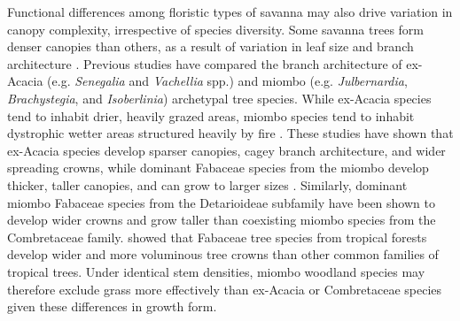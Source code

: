 \begin{refsection}
Functional differences among floristic types of savanna may also drive variation in canopy complexity, irrespective of species diversity. Some savanna trees form denser canopies than others, as a result of variation in leaf size and branch architecture \citep{CharlesDominique2018}. Previous studies have compared the branch architecture of ex-Acacia (e.g. \textit{Senegalia} and \textit{Vachellia} spp.) and miombo (e.g. \textit{Julbernardia}, \textit{Brachystegia}, and \textit{Isoberlinia}) archetypal tree species. While ex-Acacia species tend to inhabit drier, heavily grazed areas, miombo species tend to inhabit dystrophic wetter areas structured heavily by fire \citep{Ribeiro2020}. These studies have shown that ex-Acacia species develop sparser canopies, cagey branch architecture, and wider spreading crowns, while dominant Fabaceae species from the miombo develop thicker, taller canopies, and can grow to larger sizes \citep{Mugasha2013, Archibald2003, Privette2004}. Similarly, dominant miombo Fabaceae species from the Detarioideae subfamily have been shown to develop wider crowns and grow taller than coexisting miombo species from the Combretaceae family. \citet{Shenkin2020} showed that Fabaceae tree species from tropical forests develop wider and more voluminous tree crowns than other common families of tropical trees. Under identical stem densities, miombo woodland species may therefore exclude grass more effectively than ex-Acacia or Combretaceae species given these differences in growth form. 


\end{refsection}
